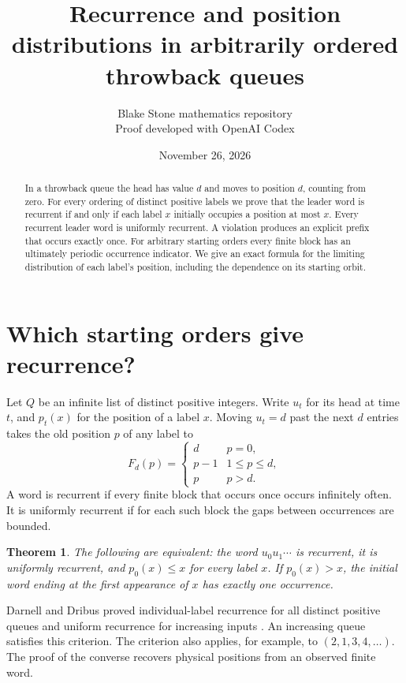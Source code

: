 \documentclass[11pt]{article}
\title{Recurrence and position distributions in arbitrarily ordered throwback queues}
\author{Blake Stone mathematics repository\\[-2pt]\small Proof developed with OpenAI Codex}
\date{November 26, 2026}
\newtheorem{theorem}{Theorem}
\begin{document}
\maketitle
\begin{abstract}
In a throwback queue the head has value $d$ and moves to position $d$, counting from zero.
For every ordering of distinct positive labels we prove that the leader word is recurrent
if and only if each label $x$ initially occupies a position at most $x$. Every recurrent
leader word is uniformly recurrent. A violation produces an explicit prefix that occurs
exactly once. For arbitrary starting orders every finite block has an ultimately periodic
occurrence indicator. We give an exact formula for the limiting distribution of each
label's position, including the dependence on its starting orbit.
\end{abstract}

\section{Which starting orders give recurrence?}
Let $Q$ be an infinite list of distinct positive integers. Write $u_t$ for its head at time
$t$, and $p_t(x)$ for the position of a label $x$. Moving $u_t=d$ past the next $d$ entries
takes the old position $p$ of any label to
\[
 F_d(p)=\begin{cases}d&p=0,\\p-1&1\le p\le d,\\p&p>d.\end{cases}
\]
A word is recurrent if every finite block that occurs once occurs infinitely often. It is
uniformly recurrent if for each such block the gaps between occurrences are bounded.

\begin{theorem}\label{th:rec}
The following are equivalent: the word $u_0u_1\cdots$ is recurrent, it is uniformly
recurrent, and $p_0(x)\le x$ for every label $x$. If $p_0(x)>x$, the initial word ending
at the first appearance of $x$ has exactly one occurrence.
\end{theorem}

Darnell and Dribus proved individual-label recurrence for all distinct positive queues and
uniform recurrence for increasing inputs \cite[Theorems 2 and 7]{dd}. An increasing queue
satisfies this criterion. The criterion also applies, for example, to $(2,1,3,4,\ldots)$.
The proof of the converse recovers physical positions from an observed finite word.
\end{document}
